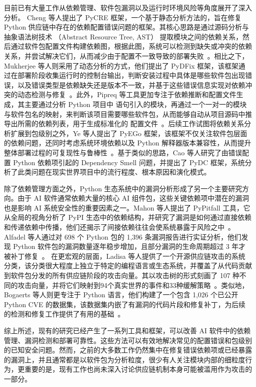 目前已有大量工作从依赖管理、软件包漏洞以及运行时环境风险等角度展开了深入分析。
Cheng 等人提出了 PyCRE 框架，一个基于静态分析方法的，旨在修复 Python 供应链中存在的依赖配置错误问题的框架。其核心思路是通过源码分析与抽象语法树技术 （Abstract Resource Tree, AST） 提取模块之间的依赖关系，然后通过软件包配置文件构建依赖图，根据此图，系统可以检测到缺失或冲突的依赖关系，并尝试解决它们，从而减少由于配置不一致导致的部署失败~\cite{cheng2022conflict}。相比之下，Mukherjee 等人则采用了动态分析的方式，他们提出了 PyDFix 框架，该框架通过在部署阶段收集运行时的控制台输出，判断安装过程中具体是哪些软件包出现错误，以及错误类型是依赖缺失还是版本不一致，并基于这些错误信息实现对依赖冲突的动态检测与修复~\cite{mukherjee2021fixing}。此外，Pipreq 等工具更加专注于依赖推断和配置文件生成，其主要通过分析 Python 项目中  语句引入的模块，再通过一个一对一的模块与软件包名的映射，来判断该项目需要哪些软件包，从而能够自动从项目源码中推导出所需的依赖列表，用于生成标准化的  配置文件~\cite{pipreq}。后续工作试图将依赖关系分析扩展到包级别之外，Ye 等人提出了 PyEGo 框架，该框架不仅关注软件包层面的依赖问题，还同时考虑系统环境依赖以及 Python 解释器版本兼容性，从而提升整体部署过程的可复现性与鲁棒性~\cite{ye2022knowledge}。基于类似的思路，Cao 等人研究了由错误配置 Python 依赖项引起的 Dependency Smell 问题，并提出了 PyDC 框架，系统分析了此类问题在现实世界项目中的流行程度、根本原因和演化模式。

除了依赖管理方面之外，Python 生态系统中的漏洞分析形成了另一个主要研究方向。由于 AI 软件通常依赖大量的核心 AI 组件包，这些关键依赖项中潜在的漏洞也是影响 AI 系统安全性的重要因素之一。Mahon 等人提出了 PyPitfall 工具，它从全局的视角分析了 PyPI 生态中的依赖结构，并研究了漏洞是如何通过直接依赖和传递依赖中传播，他们还揭示了间接依赖往往会使系统暴露于风险之中~\cite{mahon2025pypitfall}。Alfadel 等人通过对 698 个 Python 包的 1,396 条漏洞报告进行实证分析，他们发现 Python 软件包的漏洞数量逐年稳步增加，且部分漏洞的生命周期超过 3 年才被补丁修复~\cite{alfadel2023empirical}。
在更宏观的层面，Ladisa 等人提供了一个开源供应链攻击的系统分类，该分类很大程度上独立于特定的编程语言或生态系统，并覆盖了从代码贡献到软件包分发的所有供应链阶段的攻击向量。其以攻击树的形式刻画了 107 种不同的攻击向量，并将它们映射到94个真实世界的事件和33种缓解策略~\cite{ladisa2023taxonomy}。类似地，Bogaerts 等人则更专注于 Python 语言，他们构建了一个包含 1,026 个已公开 Python CVE 的数据集，该数据集内嵌了有漏洞的代码片段和修复补丁，为后续的检测和修复工作提供了有用的基础~\cite{bogaerts2024python}。

综上所述，现有的研究已经产生了一系列工具和框架，可以改善 AI 软件中的依赖管理、漏洞检测和部署可靠性。这些方法可以有效地解决常见的配置错误和包级别的已知安全问题。然而，之前的大多数工作仍然集中在修复错误依赖项或已经暴露的漏洞上，并且通常都是以软件包为分析粒度，很少有人关注模块内部的细粒度行为，更重要的是，现有工作也尚未深入讨论供应链机制本身可能被滥用作为攻击的一部分。

